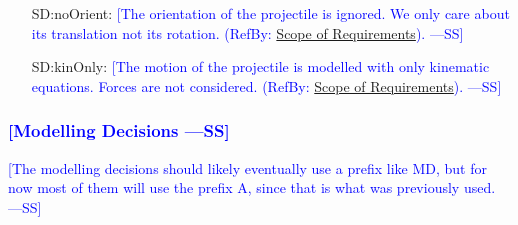 \documentclass[12pt]{article}
\newcommand{\authornote}[3]{\textcolor{#1}{[#3 ---#2]}}
\newcommand{\authornote}[3]{}
\newcommand{\wss}[1]{\authornote{blue}{SS}{#1}}
\begin{document}
\begin{itemize}
\item[SD:noOrient:\phantomsection\label{SD:noOrient}]{\wss{The orientation of the projectile is ignored. We only care about its translation not its rotation.  (RefBy: \hyperref[Sec:ReqsScope]{Scope of Requirements}).}}
\item[SD:kinOnly:\phantomsection\label{SD:kinOnly}]{\wss{The motion of the
projectile is modelled with only kinematic equations. Forces are not
considered. (RefBy: \hyperref[Sec:ReqsScope]{Scope of Requirements}).}} 
\end{itemize}

\subsubsection{\wss{Modelling Decisions}}
\label{Sec:ModelDec}

\wss{The modelling decisions should likely eventually use a prefix like MD, but
for now most of them will use the prefix A, since that is what was previously
used.}
\end{document}
